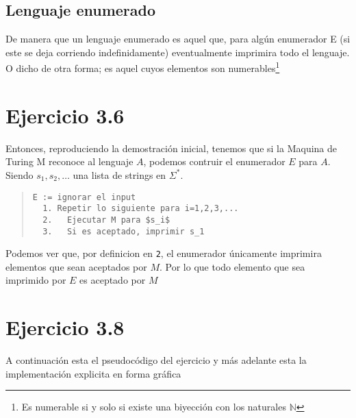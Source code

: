 \documentclass[11pt]{article}
\begin{document}
\subsection*{Lenguaje enumerado}

De manera que un lenguaje enumerado es aquel que, para alg\'un enumerador E (si este se deja corriendo indefinidamente) eventualmente imprimira todo el lenguaje. O dicho de otra forma; es aquel cuyos elementos son numerables\footnote{Es numerable si y solo si existe una biyecci\'on con los naturales $\mathbb N$}










\section*{Ejercicio 3.6}

	\par Entonces, reproduciendo la demostraci\'on inicial, tenemos que si la Maquina de Turing M reconoce al lenguaje $A$, podemos contruir el enumerador $E$ para $A$. Siendo $s_1, s_2, \dots$ una lista de strings en $\Sigma^*$.

\begin{quote}\begin{lstlisting}
E := ignorar el input
  1. Repetir lo siguiente para i=1,2,3,...
  2.   Ejecutar M para $s_i$
  3.   Si es aceptado, imprimir s_1
\end{lstlisting}\end{quote}

	\par Podemos ver que, por definicion en \verb|2|, el enumerador \'unicamente imprimira elementos que sean aceptados por $M$. Por lo que todo elemento que sea imprimido por $E$ es aceptado por $M$











\section*{Ejercicio 3.8}
	
	\par A continuaci\'on esta el pseudoc\'odigo del ejercicio y m\'as adelante esta la implementaci\'on explicita en forma gr\'afica
\end{document}
